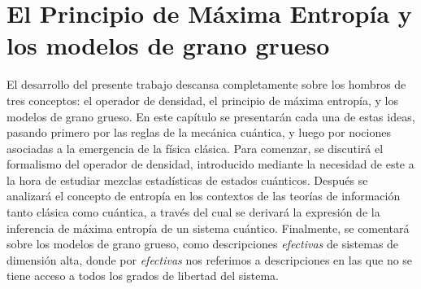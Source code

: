 \chapter{El Principio de Máxima Entropía y los modelos de grano grueso}
\label{ch:2}

El desarrollo del presente trabajo descansa completamente sobre los hombros de tres conceptos: el operador de densidad, el principio de máxima entropía, y los modelos de grano grueso. En este capítulo se presentarán cada una de estas ideas, pasando primero por las reglas de la mecánica cuántica, y luego por nociones asociadas a la emergencia de la física clásica. Para comenzar, se discutirá el formalismo del operador de densidad, introducido mediante la necesidad de este a la hora de estudiar mezclas estadísticas de estados cuánticos. Después se analizará el concepto de entropía en los contextos de las teorías de información tanto clásica como cuántica, a través del cual se derivará la expresión de la inferencia de máxima entropía de un sistema cuántico. Finalmente, se comentará sobre los modelos de grano grueso, como descripciones \textit{efectivas} de sistemas de dimensión alta, donde por \textit{efectivas} nos referimos a descripciones en las que no se tiene acceso a todos los grados de libertad del sistema.






\newpage